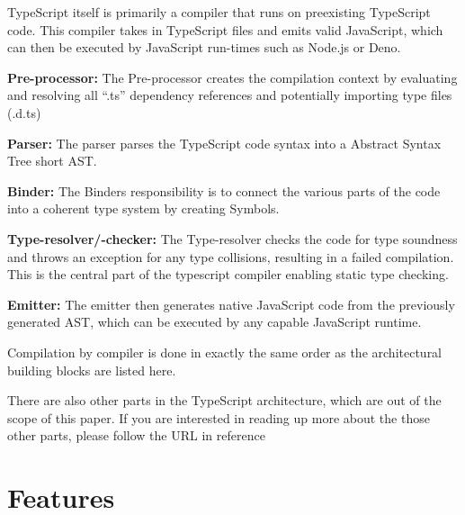 \documentclass[english,runningheads, letterpaper]{llncs}[2018/03/10]
\begin{document}
TypeScript itself is primarily a compiler that runs on preexisting TypeScript code. This compiler takes in TypeScript files and emits valid JavaScript, which can then be executed by JavaScript run-times such as Node.js or Deno.

\medskip
\noindent
\begin{list}{•}{These are the building blocks of the TypeScript compiler\cite{ref_ts_architecture}:}

\item \textbf{Pre-processor:} The Pre-processor creates the compilation context by evaluating and resolving all ``.ts'' dependency references and potentially importing type files (.d.ts) 

\item \textbf{Parser:} The parser parses the TypeScript code syntax into a Abstract Syntax Tree short AST.

\item \textbf{Binder:} The Binders responsibility is to connect the various parts of the code into a coherent type system by creating Symbols.

\item \textbf{Type-resolver/-checker:} The Type-resolver checks the code for type soundness and throws an exception for any type collisions, resulting in a failed compilation. This is the central part of the typescript compiler enabling static type checking.

\item \textbf{Emitter:} The emitter then generates native JavaScript code from the previously generated AST, which can be executed by any capable JavaScript runtime.

\end{list}

\begin{note}
Compilation by compiler is done in exactly the same order as the architectural building blocks are listed here.
\end{note}

\begin{note}
There are also other parts in the TypeScript architecture, which are out of the scope of this paper. If you are interested in reading up more about the those other parts, please follow the URL in reference \cite{ref_ts_architecture}
\end{note}

\section{Features}
\end{document}
